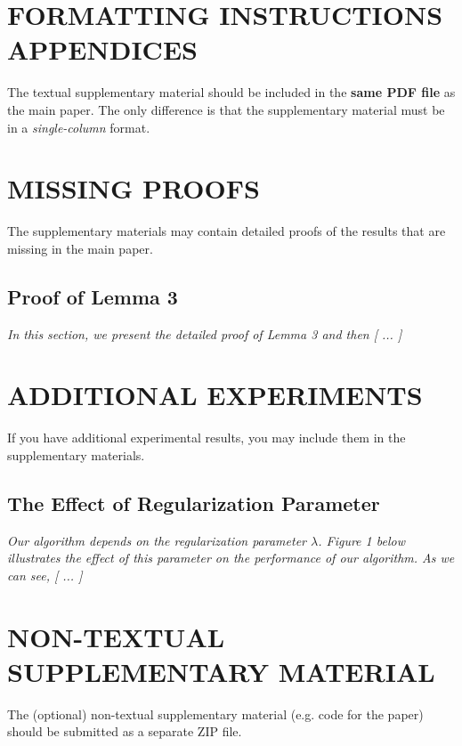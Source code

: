 \documentclass[twoside]{article}
\begin{document}
\appendix
\onecolumn

\section{FORMATTING INSTRUCTIONS APPENDICES}

The textual supplementary material should be included in the \textbf{same PDF file} as the main paper. The only difference is that the supplementary material must be in a \emph{single-column} format.

\section{MISSING PROOFS}

The supplementary materials may contain detailed proofs of the results that are missing in the main paper.

\subsection{Proof of Lemma 3}

\textit{In this section, we present the detailed proof of Lemma 3 and then [ ... ]}

\section{ADDITIONAL EXPERIMENTS}

If you have additional experimental results, you may include them in the supplementary materials.

\subsection{The Effect of Regularization Parameter}

\textit{Our algorithm depends on the regularization parameter $\lambda$. Figure 1 below illustrates the effect of this parameter on the performance of our algorithm. As we can see, [ ... ]}

\section{NON-TEXTUAL SUPPLEMENTARY MATERIAL}

The (optional) non-textual supplementary material (e.g. code for the paper) should be submitted as a separate ZIP file.
\end{document}
